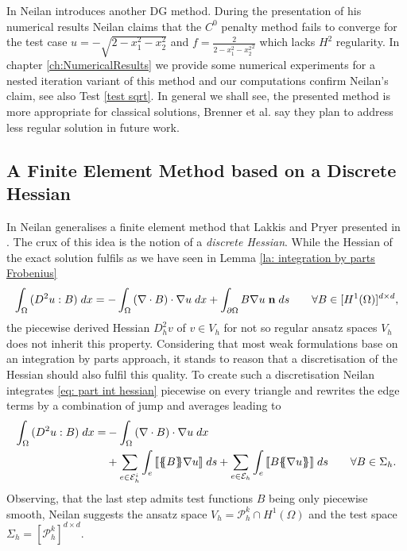 In \cite{Neilan2014} Neilan introduces another DG method. During the presentation of his numerical results Neilan claims that the $C^0$ penalty method fails to converge for the test case $u = -\sqrt{2 - x_1^2 - x_2^2 }$ and $f = \frac 2 {{2 - x_1^2 - x_2^2}^2}$ which lacks $H^2$ regularity. 
In chapter \ref{ch:NumericalResults} we provide some numerical experiments for a nested iteration variant of this method and our computations confirm Neilan's claim, see also Test \ref{test sqrt}. In general we shall see, the presented method is more appropriate for classical solutions, Brenner et al. say they plan to address less regular solution in future work. 


\subsection{A Finite Element Method based on a Discrete Hessian} \label{subsec: disrete Hessian} \label{sec: FEM discrete Hessian}

In \cite{Neilan2014} Neilan generalises a finite element method that Lakkis and Pryer presented in \cite{LP2011}.
The crux of this idea is the notion of a \emph{discrete Hessian}. 
While the Hessian of the exact solution fulfils as we have seen in Lemma \ref{la: integration by parts Frobenius}
	\begin{align}
		\int_{\Omega} {{ (D^2 u : B)}\;dx} = 
			- \int_{\Omega} {{ \left(\nabla \cdot B\right) \cdot \nabla u}\;dx} 
			+ \int_{\partial \Omega} {{B \nabla u \; \mathbf {n}}\;ds} \qquad \forall B \in [H^1(\Omega)]^{d \times d}, \label{eq: part int hessian}
	\end{align}
the piecewise derived Hessian $D_h^2 v$ of $ v \in V_h$ for not so regular ansatz spaces $V_h$ does not inherit this property. Considering that most weak formulations base on an integration by parts approach, it stands to reason that a discretisation of the Hessian should also fulfil this quality. To create such a discretisation Neilan integrates \eqref{eq: part int hessian} piecewise on every triangle and rewrites the edge terms by a combination of jump and averages leading to
	\begin{align}
		\myIntX  \Omega { (D^2 u : B)}
		=& - \myIntX  \Omega { \left(\nabla \cdot B\right) \cdot \nabla u} \nonumber \\
			&+ \sum_{ e \in \edgesi} \myIntS e { \jump {\average B \nabla u }}
			+ \sum_{ e \in \edges} \myIntS e {  \jump{B \average {\nabla u} }}  \qquad \forall B \in \Sigma_h. \label{eq: part int hessian omega}
	\end{align}
Observing, that the last step admits test functions $B$ being only piecewise smooth, Neilan suggests the ansatz space $V_h = \mathcal{P}_h^k \cap H^1(\Omega)$ and the test space $\Sigma_h = [\mathcal{P}_h^k]^{d \times d}$.

